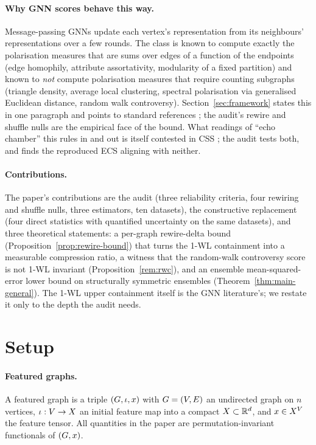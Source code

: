 \documentclass[letterpaper]{article} %
\begin{document}
\paragraph{Why GNN scores behave this way.} Message-passing
GNNs update each vertex's representation from its
neighbours' representations over a few rounds. The class is
known to compute exactly the polarisation measures that are
sums over edges of a function of the endpoints (edge
homophily, attribute assortativity, modularity of a fixed
partition) and known to \emph{not} compute polarisation
measures that require counting subgraphs (triangle density,
average local clustering, spectral polarisation via
generalised Euclidean distance, random walk controversy).
Section~\ref{sec:framework} states this in one paragraph and
points to standard references \citep{MorrisWL2019, XuGIN2019,
ChenVillar2019, AzizianLelarge2021}; the audit's rewire and
shuffle nulls are the empirical face of the bound. What
readings of ``echo chamber'' this rules in and out is itself
contested in CSS \citep{AdamicGlance2005, Barbera2015,
GuessExposure2018, YardiBoyd2010}; the audit tests both, and
finds the reproduced ECS aligning with neither.

\paragraph{Contributions.} The paper's contributions are the
audit (three reliability criteria, four rewiring and shuffle
nulls, three estimators, ten datasets), the constructive
replacement (four direct statistics with quantified
uncertainty on the same datasets), and three theoretical
statements: a per-graph rewire-delta bound
(Proposition~\ref{prop:rewire-bound}) that turns the 1-WL
containment into a measurable compression ratio, a witness
that the random-walk controversy score
\citep{Garimella18} is not 1-WL invariant
(Proposition~\ref{rem:rwc}), and an ensemble mean-squared-error
lower bound on structurally symmetric ensembles
(Theorem~\ref{thm:main-general}). The 1-WL upper containment
itself is the GNN literature's; we restate it only to the
depth the audit needs.

\section{Setup}\label{sec:setup}

\paragraph{Featured graphs.} A featured graph is a triple $(G,
\iota, x)$ with $G = (V, E)$ an undirected graph on
$n$ vertices, $\iota: V \to X$ an initial feature map into
a compact $X \subset \mathbb{R}^d$, and $x \in X^V$ the feature
tensor. All quantities in the paper are
permutation-invariant functionals of $(G, x)$.
\end{document}
